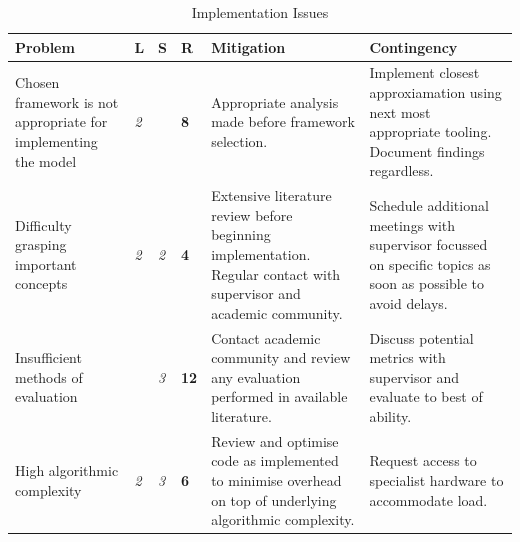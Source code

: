 \documentclass[12pt]{article}
\begin{document}
	\begin{table}[h!]
		\centering
		\caption{Implementation Issues}
		\label{table:risk3}
		\footnotesize
		\begin{tabular}{|>{\centering}m{1.5in} |>{\centering}m{0.1in} |>{\centering}m{0.1in} |>{\centering}m{0.3in} |>{\centering}m{1.8in} |>{\centering\arraybackslash}m{1.8in}|}
			\hline
			\textbf{Problem}                                               & \textbf{L}                                                & \textbf{S}                                                & \textbf{R}                          & \textbf{Mitigation}                                                                                                  & \textbf{Contingency}                                                                                          \\ \hline
			Chosen framework is not appropriate for implementing the model & \cellcolor[HTML]{F8FF00}\textit{2}                        & \cellcolor[HTML]{F88602}{\color[HTML]{333333} \textit{4}} & \cellcolor[HTML]{FFC702}\textbf{8}  & Appropriate analysis made before framework selection.                                                                & Implement closest approxiamation using next most appropriate tooling. Document findings regardless.           \\ \hline
			Difficulty grasping important concepts                         & \cellcolor[HTML]{F8FF00}\textit{2}                        & \cellcolor[HTML]{F8FF00}\textit{2}                        & \cellcolor[HTML]{F8FF00}\textbf{4}  & Extensive literature review before beginning implementation. Regular contact with supervisor and academic community. & Schedule additional meetings with supervisor focussed on specific topics as soon as possible to avoid delays. \\ \hline
			Insufficient methods of evaluation                             & \cellcolor[HTML]{F88602}{\color[HTML]{333333} \textit{4}} & \cellcolor[HTML]{FFC702}\textit{3}                        & \cellcolor[HTML]{F88602}\textbf{12} & Contact academic community and review any evaluation performed in available literature.                              & Discuss potential metrics with supervisor and evaluate to best of ability.                                    \\ \hline
			High algorithmic complexity                                    & \cellcolor[HTML]{F8FF00}\textit{2}                        & \cellcolor[HTML]{FFC702}\textit{3}                        & \cellcolor[HTML]{FFC702}\textbf{6}  & Review and optimise code as implemented to minimise overhead on top of underlying algorithmic complexity.            & Request access to specialist hardware to accommodate load.                                                    \\ \hline

\end{tabular}
\end{table}
\end{document}
